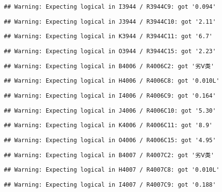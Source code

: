 \documentclass[
]{article}
\begin{document}
\begin{verbatim}
## Warning: Expecting logical in I3944 / R3944C9: got '0.094'
\end{verbatim}

\begin{verbatim}
## Warning: Expecting logical in J3944 / R3944C10: got '2.11'
\end{verbatim}

\begin{verbatim}
## Warning: Expecting logical in K3944 / R3944C11: got '6.7'
\end{verbatim}

\begin{verbatim}
## Warning: Expecting logical in O3944 / R3944C15: got '2.23'
\end{verbatim}

\begin{verbatim}
## Warning: Expecting logical in B4006 / R4006C2: got '劣Ⅴ类'
\end{verbatim}

\begin{verbatim}
## Warning: Expecting logical in H4006 / R4006C8: got '0.010L'
\end{verbatim}

\begin{verbatim}
## Warning: Expecting logical in I4006 / R4006C9: got '0.164'
\end{verbatim}

\begin{verbatim}
## Warning: Expecting logical in J4006 / R4006C10: got '5.30'
\end{verbatim}

\begin{verbatim}
## Warning: Expecting logical in K4006 / R4006C11: got '8.9'
\end{verbatim}

\begin{verbatim}
## Warning: Expecting logical in O4006 / R4006C15: got '4.95'
\end{verbatim}

\begin{verbatim}
## Warning: Expecting logical in B4007 / R4007C2: got '劣Ⅴ类'
\end{verbatim}

\begin{verbatim}
## Warning: Expecting logical in H4007 / R4007C8: got '0.010L'
\end{verbatim}

\begin{verbatim}
## Warning: Expecting logical in I4007 / R4007C9: got '0.188'
\end{verbatim}
\end{document}

